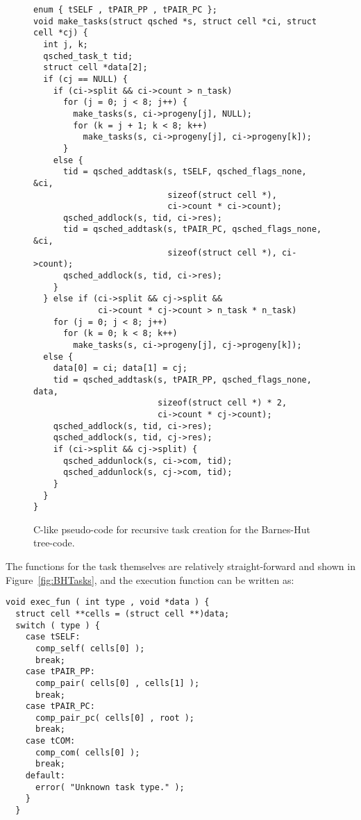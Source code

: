 \documentclass[preprint]{elsarticle}
\newcommand{\fig}[1]
    {Figure~\ref{fig:#1}}
\begin{document}
\begin{figure}
\begin{center}\begin{minipage}{0.9\textwidth}
    \begin{lstlisting}[basicstyle=\scriptsize\tt]
enum { tSELF , tPAIR_PP , tPAIR_PC };
void make_tasks(struct qsched *s, struct cell *ci, struct cell *cj) {
  int j, k;
  qsched_task_t tid;
  struct cell *data[2];
  if (cj == NULL) {
    if (ci->split && ci->count > n_task)
      for (j = 0; j < 8; j++) {
        make_tasks(s, ci->progeny[j], NULL);
        for (k = j + 1; k < 8; k++)
          make_tasks(s, ci->progeny[j], ci->progeny[k]);
      }
    else {
      tid = qsched_addtask(s, tSELF, qsched_flags_none, &ci,
                           sizeof(struct cell *),
                           ci->count * ci->count);
      qsched_addlock(s, tid, ci->res);
      tid = qsched_addtask(s, tPAIR_PC, qsched_flags_none, &ci,
                           sizeof(struct cell *), ci->count);
      qsched_addlock(s, tid, ci->res);
    }
  } else if (ci->split && cj->split &&
             ci->count * cj->count > n_task * n_task)
    for (j = 0; j < 8; j++)
      for (k = 0; k < 8; k++)
        make_tasks(s, ci->progeny[j], cj->progeny[k]);
  else {
    data[0] = ci; data[1] = cj;
    tid = qsched_addtask(s, tPAIR_PP, qsched_flags_none, data,
                         sizeof(struct cell *) * 2,
                         ci->count * cj->count);
    qsched_addlock(s, tid, ci->res);
    qsched_addlock(s, tid, cj->res);
    if (ci->split && cj->split) {
      qsched_addunlock(s, ci->com, tid);
      qsched_addunlock(s, cj->com, tid);
    }
  }
}
    \end{lstlisting}
\end{minipage}\end{center}
    \caption{C-like pseudo-code for recursive task creation
        for the Barnes-Hut tree-code.}
    \label{fig:MakeTasks}
\end{figure}

The functions for the task themselves are relatively
straight-forward and shown in \fig{BHTasks}, and the
execution function can be written as:
\begin{center}\begin{minipage}{0.9\textwidth}
    \begin{lstlisting}
void exec_fun ( int type , void *data ) {
  struct cell **cells = (struct cell **)data;
  switch ( type ) {
    case tSELF:
      comp_self( cells[0] );
      break;
    case tPAIR_PP:
      comp_pair( cells[0] , cells[1] );
      break;
    case tPAIR_PC:
      comp_pair_pc( cells[0] , root );
      break;
    case tCOM:
      comp_com( cells[0] );
      break;
    default:
      error( "Unknown task type." );
    }
  }
    \end{lstlisting}
\end{minipage}\end{center}
\end{document}
